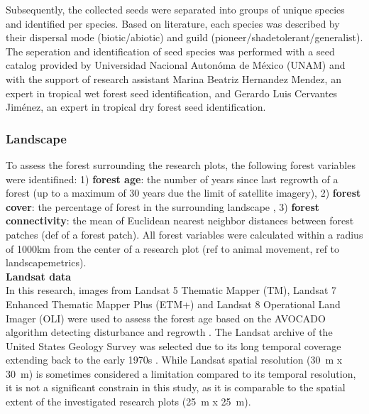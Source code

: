Subsequently, the collected seeds were separated into groups of unique species and identified per species. Based on literature, each species was described by their dispersal mode (biotic/abiotic) and guild (pioneer/shadetolerant/generalist). The seperation and identification of seed species was performed with a seed catalog provided by Universidad Nacional Autonóma de México (UNAM) and with the support of research assistant Marina Beatriz Hernandez Mendez, an expert in tropical wet forest seed identification, and Gerardo Luis Cervantes Jiménez, an expert in tropical dry forest seed identification. 


\subsubsection{Landscape}

To  assess the forest surrounding the research plots, the following forest variables were identifined: 1) \textbf{forest age}: the number of years since last regrowth of a forest (up to a maximum of 30 years due the limit of satellite imagery), 2) \textbf{forest cover}: the percentage of forest in the surrounding landscape \citep{hesselbarth2019landscapemetrics}, 3) \textbf{forest connectivity}: the mean of Euclidean nearest neighbor distances between forest patches (def of a forest patch). All forest variables were calculated within a radius of 1000km from the center of a research plot \citep{hesselbarth2019landscapemetrics} (ref to animal movement, ref to landscapemetrics).  \\

\textbf{Landsat data}\\

In this research, images from Landsat 5 Thematic Mapper (TM), Landsat 7 Enhanced Thematic Mapper Plus (ETM+) and Landsat 8 Operational Land Imager (OLI) were used to assess the forest age based on the AVOCADO algorithm detecting disturbance and regrowth \citep{decuyperContinuousMonitoringForest2022}. The Landsat archive of the United States Geology Survey was selected due to its long temporal coverage extending back to the early 1970s \citep{kennedyBringingEcologicalView2014, finerCombatingDeforestationSatellite2018}. While Landsat spatial resolution (30~m x 30~m) is sometimes considered a limitation compared to its temporal resolution, it is not a significant constrain in this study, as it is comparable to the spatial extent of the investigated research plots (25~m x 25~m). 

